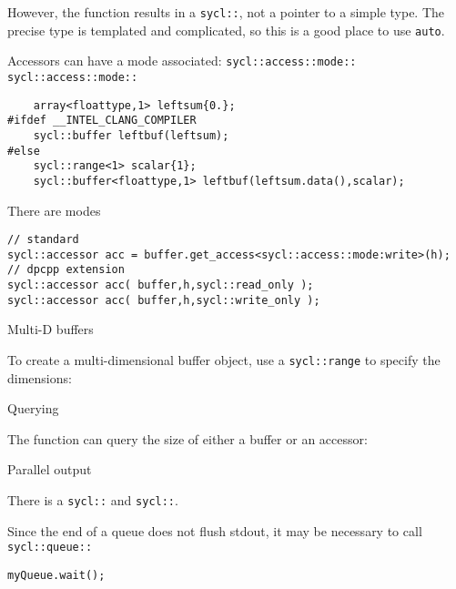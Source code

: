 
However, the  function results
in a \lstinline+sycl::+, not a pointer to a simple type.
The precise type is templated and complicated, so this 
is a good place to use \lstinline+auto+.

Accessors can have a mode associated:
\lstinline+sycl::access::mode::+
\lstinline+sycl::access::mode::+

\begin{dpcppnote}
\begin{lstlisting}
    array<floattype,1> leftsum{0.};
#ifdef __INTEL_CLANG_COMPILER
    sycl::buffer leftbuf(leftsum);
#else
    sycl::range<1> scalar{1};
    sycl::buffer<floattype,1> leftbuf(leftsum.data(),scalar);
\end{lstlisting}
\end{dpcppnote}

\begin{dpcppnote}
There are modes
\begin{lstlisting}
// standard
sycl::accessor acc = buffer.get_access<sycl::access::mode:write>(h);
// dpcpp extension
sycl::accessor acc( buffer,h,sycl::read_only );
sycl::accessor acc( buffer,h,sycl::write_only );
\end{lstlisting}
\end{dpcppnote}

 {Multi-D buffers}

To create a multi-dimensional buffer object,
use a \lstinline{sycl::range} to specify the dimensions:
%

 {Querying}

The function  can query the size of either a buffer
or an accessor:

 {Parallel output}

There is a \lstinline+sycl::+ and \lstinline+sycl::+.


Since the end of a queue does not flush stdout,
it may be necessary to call
\lstinline+sycl::queue::+
\begin{lstlisting}
myQueue.wait();  
\end{lstlisting}

